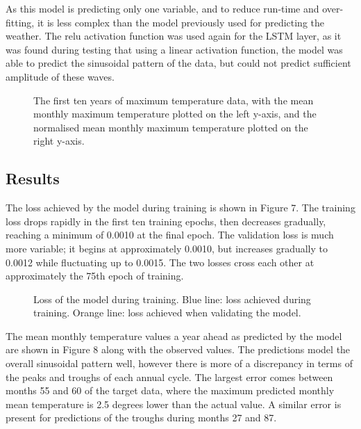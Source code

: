 \documentclass[12pt]{article}
\begin{document}
    As this model is predicting only one variable, and to reduce run-time and over-fitting, it is less complex than the model previously 
    used for predicting the weather. The relu activation function was used again for the LSTM layer, as it was found during testing that
    using a linear activation function, the model was able to predict the sinusoidal pattern of the data, but could not predict sufficient 
    amplitude of these waves.

    \begin{figure}
    \centering
        
        \caption{The first ten years of maximum temperature data, with the mean monthly maximum temperature plotted on the left y-axis, 
        and the normalised mean monthly maximum temperature plotted on the right y-axis.}
        \label{fig:climate_input_temps}
    \end{figure}
    
\subsection{Results}

    The loss achieved by the model during training is shown in Figure 7. The training loss drops rapidly in the first ten training epochs, 
    then decreases gradually, reaching a minimum of 0.0010 at the final epoch. The validation loss is much more variable; it begins at 
    approximately 0.0010, but increases gradually to 0.0012 while fluctuating up to 0.0015. The two losses cross each other at approximately 
    the 75th epoch of training.
    
    \begin{figure}
        \centering
        
        \caption{Loss of the model during training. Blue line: loss achieved during training. Orange line: loss achieved when validating the model.}
        \label{fig:climate_loss}
    \end{figure}

    The mean monthly temperature values a year ahead as predicted by the model are shown in Figure 8 along with the observed values. 
    The predictions model the overall sinusoidal pattern well, however there is more of a discrepancy in terms of the peaks and troughs of 
    each annual cycle. The largest error comes between months 55 and 60 of the target data, where the maximum predicted monthly mean 
    temperature is 2.5 degrees lower than the actual value. A similar error is present for predictions of the troughs during months 27 and 87.
    
\end{document}

